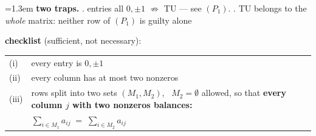 \documentclass[10pt]{article}
\newenvironment{board}{%
  \par\vspace{2pt}
  \begingroup\leftskip=1.3em\relax}{%
  \par\endgroup\vspace{2pt}}
\begin{document}
\begin{board}
\textbf{two traps.} . entries all $0, \pm 1$ $\not\Rightarrow$ TU --- see $(P_1)$. . TU belongs to the \emph{whole} matrix: neither row of $(P_1)$ is guilty alone
\vspace{3pt}

\textbf{checklist} (sufficient, not necessary):
\begin{center}
\begin{tabular}{@{}l|l@{}}
 (i) & every entry is $0, \pm 1$ \\[2pt]
 (ii) & every column has at most two nonzeros \\[2pt]
 (iii) & rows split into two sets $(M_1, M_2)$, \ $M_2 = \emptyset$ allowed, so that \textbf{every column $j$ with two nonzeros balances:} \\
       & \qquad $\displaystyle\sum_{i \in M_1} a_{ij} \;=\; \sum_{i \in M_2} a_{ij}$ \\
\end{tabular}
\end{center}
\vspace{2pt}


\end{board}
\end{document}
